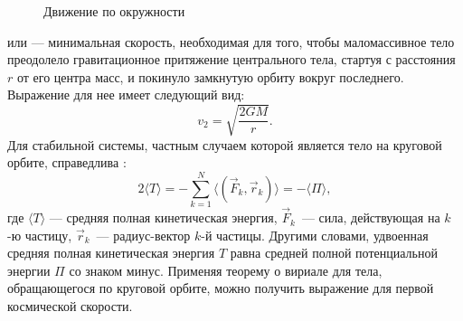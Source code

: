 \begin{wrapfigure}[10]{r}{.5\tw}
	\centering
	\vspace{-1pc}
	\caption{Движение по окружности \label{pic:orb-vel}}
\end{wrapfigure}

 или  ---
минимальная скорость, необходимая для того, чтобы маломассивное тело преодолело гравитационное притяжение центрального тела, стартуя с расстояния $r$ от его центра масс, и покинуло замкнутую орбиту вокруг
последнего. Выражение для нее имеет следующий вид:
\begin{equation}
	v_{2}=\sqrt{\frac{2GM}{r}}.
\end{equation}
Для стабильной системы, частным случаем которой является тело на круговой орбите, справедлива
:
\begin{equation}
	2 \langle T\rangle
	= -\sum _{{k=1}}^{N}\langle (\vec{F}_{k}, \vec{r}_{k})\rangle
	= -\langle \Pi \rangle,
\end{equation}
где $\langle T\rangle$ --- средняя полная кинетическая энергия, $\vec{F}_k$~--- сила,
действующая на $k$-ю частицу, $\vec{r}_k$~--- радиус-вектор $k$-й частицы. Другими словами, удвоенная средняя полная
кинетическая энергия $T$ равна средней полной потенциальной энергии $\Pi$ со знаком минус. Применяя теорему о вириале для тела, обращающегося по круговой орбите, можно
получить выражение для первой космической скорости.
